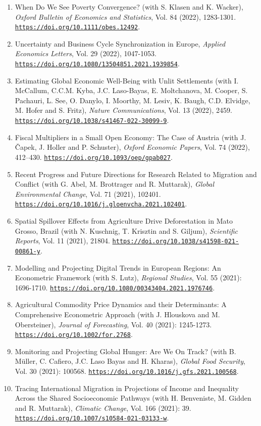 \documentclass[10pt]{res} %
\newcommand{\doiurl}[1]{\href{https://doi.org/#1}{\nolinkurl{https://doi.org/#1}}}
\begin{document}
\begin{resume}
\begin{enumerate}
\item When Do We See Poverty Convergence? (with S. Klasen and K. Wacker),  \textit{Oxford Bulletin of Economics and Statistics}, Vol. 84 (2022), 1283-1301. \doiurl{10.1111/obes.12492}.
\item Uncertainty and Business Cycle Synchronization in Europe, \textit{Applied Economics Letters}, Vol. 29 (2022), 1047-1053. \doiurl{10.1080/13504851.2021.1939854}.
\item Estimating Global Economic Well-Being with Unlit Settlements (with I. McCallum, C.C.M. Kyba, J.C. Laso-Bayas, E. Moltchanova, M. Cooper, S. Pachauri, L. See, O. Danylo, I. Moorthy, M. Lesiv, K. Baugh, C.D. Elvidge, M. Hofer and S. Fritz), \textit{Nature Communications}, Vol. 13 (2022), 2459. \doiurl{10.1038/s41467-022-30099-9}.
\item Fiscal Multipliers in a Small Open Economy: The Case of Austria (with J. \v{C}apek, J. Holler and P. Schuster), \textit{Oxford Economic Papers},  Vol. 74 (2022), 412–430. \doiurl{10.1093/oep/gpab027}.
\item Recent Progress and Future Directions for Research Related to Migration and Conflict (with G. Abel, M. Brottrager and R. Muttarak), \textit{Global Environmental Change}, Vol. 71 (2021), 102401. \doiurl{10.1016/j.gloenvcha.2021.102401}.
\item Spatial Spillover Effects from Agriculture Drive Deforestation in Mato Grosso, Brazil (with N. Kuschnig, T. Krisztin and S. Giljum), \textit{Scientific Reports}, Vol. 11 (2021), 21804. \doiurl{10.1038/s41598-021-00861-y}.
\item Modelling and Projecting Digital Trends in European Regions: An Econometric Framework (with S. Lutz), \textit{Regional Studies}, Vol. 55 (2021): 1696-1710. \doiurl{10.1080/00343404.2021.1976746}.
\item Agricultural Commodity Price Dynamics and their Determinants: A Comprehensive Econometric Approach (with J. Hlouskova and M. Obersteiner), \textit{Journal of Forecasting}, Vol. 40 (2021): 1245-1273. \doiurl{10.1002/for.2768}.
\item Monitoring and Projecting Global Hunger: Are We On Track? (with B. M\"uller, C. Cafiero, J.C. Laso Bayas and H. Kharas), \textit{Global Food Security}, Vol. 30 (2021): 100568. \doiurl{10.1016/j.gfs.2021.100568}.
\item Tracing International Migration in Projections of Income and Inequality Across the Shared Socioeconomic Pathways (with H. Benveniste, M. Gidden and R. Muttarak), \textit{Climatic Change}, Vol. 166 (2021): 39. \doiurl{10.1007/s10584-021-03133-w}.

\end{enumerate}
\end{resume}
\end{document}
